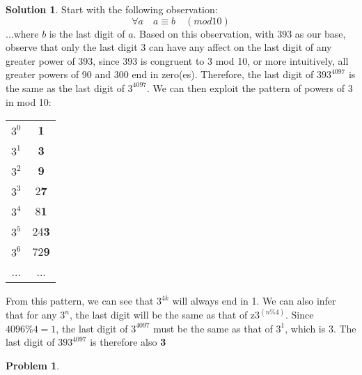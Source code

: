 \documentclass{article}
\newtheorem{problem}{Problem}
\theoremstyle{definition}
\newtheorem*{solution}{Solution}
\begin{document}
\begin{solution}
Start with the following observation:\[\forall a\quad a \equiv b \quad (mod 10)\] ...where $b$ is the last digit of $a$. Based on this observation, with 393 as our base, observe that only the last digit $3$ can have any affect on the last digit of any greater power of 393, since 393 is congruent to 3 mod 10, or more intuitively, all greater powers of 90 and 300 end in zero(es). Therefore, the last digit of $393^{4097}$ is the same as the last digit of $3^{4097}$. We can then exploit the pattern of powers of 3 in mod 10:
\begin{center}
	\begin{tabular}{c c}
		$3^0$ & \textbf{1} \\
		$3^1$ & \textbf{3} \\
		$3^2$	& \textbf{9} \\
		$3^3$	& 2\textbf{7} \\
		$3^4$	& 8\textbf{1} \\
		$3^5$	& 24\textbf{3} \\
		$3^6$	& 72\textbf{9} \\
		...		& ...
	\end{tabular}
\end{center}
From this pattern, we can see that $3^{4k}$ will always end in 1. We can also infer that for any $3^n$, the last digit will be the same as that of z$3^{(n\%4)}$. Since $4096\%4 = 1$, the last digit of $3^{4097}$ must be the same as that of $3^1$, which is 3. The last digit of $393^{4097}$ is therefore also \textbf{3}
\end{solution}
\begin{problem}
\end{problem}
\end{document}

